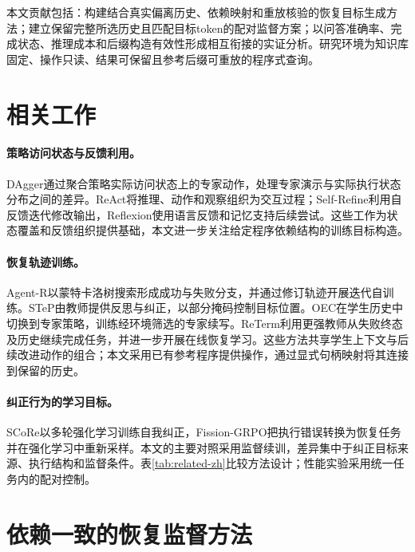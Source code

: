 本文贡献包括：构建结合真实偏离历史、依赖映射和重放核验的恢复目标生成方法；建立保留完整所选历史且匹配目标token的配对监督方案；以问答准确率、完成状态、推理成本和后缀构造有效性形成相互衔接的实证分析。研究环境为知识库固定、操作只读、结果可保留且参考后缀可重放的程序式查询。

\section{相关工作}

\paragraph{策略访问状态与反馈利用。}
DAgger通过聚合策略实际访问状态上的专家动作，处理专家演示与实际执行状态分布之间的差异\cite{ross2011dagger}。ReAct将推理、动作和观察组织为交互过程\cite{yao2023react}；Self-Refine利用自反馈迭代修改输出\cite{madaan2023selfrefine}，Reflexion使用语言反馈和记忆支持后续尝试\cite{shinn2023reflexion}。这些工作为状态覆盖和反馈组织提供基础，本文进一步关注给定程序依赖结构的训练目标构造。

\paragraph{恢复轨迹训练。}
Agent-R以蒙特卡洛树搜索形成成功与失败分支，并通过修订轨迹开展迭代自训练\cite{yuan2025agentr}。STeP由教师提供反思与纠正，以部分掩码控制目标位置\cite{chen2025step}。OEC在学生历史中切换到专家策略，训练经环境筛选的专家续写\cite{lauffer2025oec}。ReTerm利用更强教师从失败终态及历史继续完成任务，并进一步开展在线恢复学习\cite{xie2026reterm}。这些方法共享学生上下文与后续改进动作的组合；本文采用已有参考程序提供操作，通过显式句柄映射将其连接到保留的历史。

\paragraph{纠正行为的学习目标。}
SCoRe以多轮强化学习训练自我纠正\cite{kumar2025score}，Fission-GRPO把执行错误转换为恢复任务并在强化学习中重新采样\cite{zhang2026fission}。本文的主要对照采用监督续训，差异集中于纠正目标来源、执行结构和监督条件。表\ref{tab:related-zh}比较方法设计；性能实验采用统一任务内的配对控制。

\begin{table}[htbp]
\centering\small
\caption{恢复监督的目标来源与构造条件}
\label{tab:related-zh}
\RecoveryRelatedTableZH
\end{table}

\section{依赖一致的恢复监督方法}

